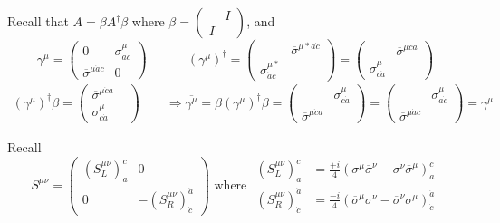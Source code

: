 \documentclass[twoside]{amsart}
\begin{document}
Recall that $\overline{A} = \beta A^{\dag} \beta$ where $\beta = \left( \begin{matrix} & I \\ I & \end{matrix} \right)$, and 
\[
\gamma^{\mu } = \left( \begin{matrix} 0 & \sigma^{\mu}_{a\dot{c}} \\ \overline{\sigma}^{\mu \dot{a} c} & 0 \end{matrix} \right) \quad \quad \quad \, 
(\gamma^{\mu} )^{\dag} = \left( \begin{matrix} & \overline{\sigma}^{\mu * a\dot{c}}  \\ \sigma^{\mu *}_{\dot{a}c} & \end{matrix} \right) = \left( \begin{matrix} & \overline{\sigma}^{\mu \dot{c} a} \\ \sigma^{\mu}_{c\dot{a}} & \end{matrix} \right)
\]
\[
\begin{gathered}
  (\gamma^{\mu})^{\dag} \beta = \left( \begin{matrix} \overline{\sigma}^{\mu \dot{c} a } & \\ \sigma^{\mu}_{c\dot{a}} \end{matrix} \right)  \quad \quad \Longrightarrow
  \overline{\gamma^{\mu}} =  \beta (\gamma^{\mu})^{\dag} \beta = \left( \begin{matrix} & \sigma^{\mu}_{c\dot{a}} \\ \overline{\sigma}^{\mu \dot{c} a} & \end{matrix} \right) =  \left( \begin{matrix} & \sigma^{\mu}_{a\dot{c}} \\ \overline{\sigma}^{\mu \dot{a} c} & \end{matrix} \right) = \gamma^{\mu}
\end{gathered}
\]

Recall
\[
S^{\mu \nu} = \left( \begin{matrix} (S_L^{\mu \nu})_a^c & 0 \\ 0 & - (S^{\mu \nu}_R )^{\dot{a}}_{\dot{c}} \end{matrix} \right) \text{ where } 
\begin{aligned} (S_L^{\mu \nu})_a^c & = \frac{ + i }{4} ( \sigma^{\mu } \overline{\sigma}^{\nu} - \sigma^{\nu} \overline{\sigma}^{\mu} )_a^c \\  (S_R^{\mu \nu})^{\dot{a}}_{\dot{c}} & = \frac{ - i }{4} ( \overline{\sigma}^{\mu } \sigma^{\nu} - \overline{\sigma}^{\nu} \sigma^{\mu} )^{\dot{a}}_{\dot{c}} \end{aligned} 
\]
\end{document}
